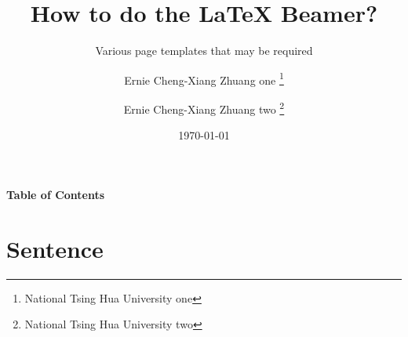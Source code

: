 \documentclass[12pt, aspectratio=169]{beamer}
\begin{document}


\title[How to do the \LaTeX{}  Beamer?]{\Huge{\textbf{How to do the \LaTeX{}  Beamer?}}} 

\subtitle{Various page templates that may be required} 

\author[Ernie Cheng-Xiang Zhuang]{%
Ernie Cheng-Xiang Zhuang one \thanks{National Tsing Hua University one} \and%
Ernie Cheng-Xiang Zhuang two \thanks{National Tsing Hua University two}
}


\date[\today]{\today}


\begin{frame}
	\titlepage %
\end{frame}


\begin{frame}{\textbf{Table of Contents}}
	\tableofcontents %
\end{frame}




\section{Sentence}
\end{document}
